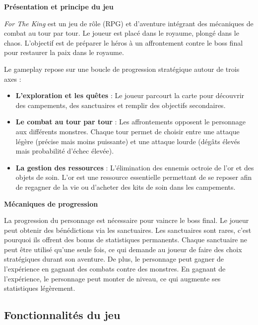 \documentclass[11pt,a4paper]{article}
\begin{document}
\textbf{Présentation et principe du jeu}

\noindent\textit{For The King} est un jeu de rôle (RPG) et d'aventure intégrant des mécaniques de combat au tour par tour. 
Le joueur est placé dans le royaume, plongé dans le chaos. 
L'objectif est de préparer le héros à un affrontement contre le boss final pour restaurer la paix dans le royaume. 

Le gameplay repose sur une boucle de progression stratégique autour de trois axes : 

\begin{itemize}
	\item \textbf{L'exploration et les quêtes} : Le joueur parcourt la carte pour découvrir des campements, des sanctuaires et remplir des objectifs secondaires.
	\item \textbf{Le combat au tour par tour} : Les affrontements opposent le personnage aux différents monstres. Chaque tour permet de choisir entre une attaque légère (précise mais moins puissante) et une attaque lourde (dégâts élevés mais probabilité d'échec élevée).
	\item \textbf{La gestion des ressources} : L'élimination des ennemis octroie de l'or et des objets de soin. L'or est une ressource essentielle permettant de se reposer afin de regagner de la vie ou d'acheter des kits de soin dans les campements.
\end{itemize} 

\medskip

\textbf{Mécaniques de progression} 

\noindent La progression du personnage est nécessaire pour vaincre le boss final. 
Le joueur peut obtenir des bénédictions via les sanctuaires. 
Les sanctuaires sont rares, c'est pourquoi ils offrent des bonus de statistiques permanents. 
Chaque sanctuaire ne peut être utilisé qu'une seule fois, ce qui demande au joueur de faire des choix stratégiques durant son aventure.
De plus, le personnage peut gagner de l'expérience en gagnant des combats contre des monstres. En gagnant de l'expérience, 
le personnage peut monter de niveau, ce qui augmente ses statistiques légèrement.

\medskip

\subsection{Fonctionnalités du jeu}
\end{document}
